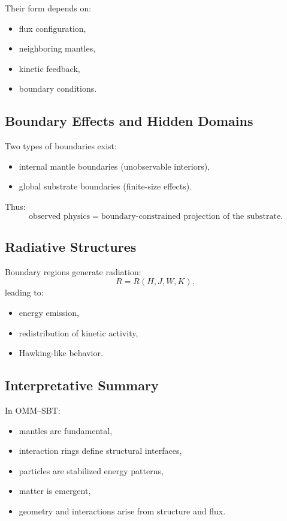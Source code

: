 \documentclass[11pt]{article}
\begin{document}
Their form depends on:
\begin{itemize}
\item flux configuration,
\item neighboring mantles,
\item kinetic feedback,
\item boundary conditions.
\end{itemize}

\subsection{Boundary Effects and Hidden Domains}

Two types of boundaries exist:
\begin{itemize}
\item internal mantle boundaries (unobservable interiors),
\item global substrate boundaries (finite-size effects).
\end{itemize}

Thus:
\begin{equation}
\text{observed physics} = \text{boundary-constrained projection of the substrate}.
\end{equation}

\subsection{Radiative Structures}

Boundary regions generate radiation:
\begin{equation}
R = R(H,J,W,K),
\end{equation}
leading to:
\begin{itemize}
\item energy emission,
\item redistribution of kinetic activity,
\item Hawking-like behavior.
\end{itemize}

\subsection{Interpretative Summary}

In OMM--SBT:
\begin{itemize}
\item mantles are fundamental,
\item interaction rings define structural interfaces,
\item particles are stabilized energy patterns,
\item matter is emergent,
\item geometry and interactions arise from structure and flux.
\end{itemize}
\end{document}
